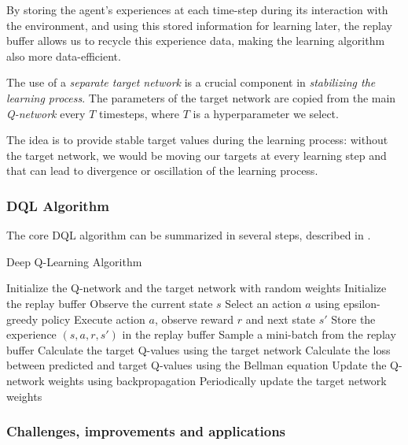 \documentclass[12pt,a4paper,openright,twoside]{book}
\begin{document}
By storing the agent's experiences at each time-step during its interaction with the environment, and using this stored information for learning later, the replay buffer allows us to recycle this experience data, making the learning algorithm also more data-efficient.

The use of a \emph{separate target network} is a crucial component in \emph{stabilizing the learning process}. The parameters of the target network are copied from the main \emph{Q-network} every $T$ timesteps, where $T$ is a hyperparameter we select. 

The idea is to provide stable target values during the learning process: without the target network, we would be moving our targets at every learning step and that can lead to divergence or oscillation of the learning process. 

\subsubsection{DQL Algorithm}

The core DQL algorithm can be summarized in several steps, described in .

\begin{algorithm}[H]
    \caption{Deep Q-Learning Algorithm}\label{dql-algorithm}
    \begin{algorithmic}[1]
        \State Initialize the Q-network and the target network with random weights
        \State Initialize the replay buffer
            \State Observe the current state $s$
            \State Select an action $a$ using epsilon-greedy policy
            \State Execute action $a$, observe reward $r$ and next state $s'$
            \State Store the experience $(s, a, r, s')$ in the replay buffer
            \State Sample a mini-batch from the replay buffer
            \State Calculate the target Q-values using the target network
            \State Calculate the loss between predicted and target Q-values using the Bellman equation
            \State Update the Q-network weights using backpropagation
            \State Periodically update the target network weights
        \EndFor
    \end{algorithmic}
\end{algorithm}

\subsubsection{Challenges, improvements and applications}
\end{document}
